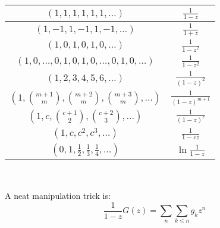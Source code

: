 \documentclass[a4paper]{amsart}
\begin{document}
\begin{multicols}{2}
      \ 

      \begin{tabular}{|c|c|}
        \hline 
        $(1,1,1,1,1,1,\ldots)$ & $\frac{1}{1-z}$ \\ \hline
        $(1,-1,1,-1,1,-1,\ldots)$ & $\frac{1}{1+z}$ \\ \hline
        $(1,0,1,0,1,0,\ldots)$ & $\frac{1}{1-z^2}$ \\ \hline        
        $(1,0,\ldots,0,1,0,1,0,\ldots,0,1,0,\ldots)$ & $\frac{1}{1-z^2}$ \\ \hline
        $(1,2,3,4,5,6,\ldots)$ & $\frac{1}{(1-z)^2}$ \\ \hline
        $(1,\binom{m+1}{m},\binom{m+2}{m},\binom{m+3}{m},\ldots)$ & $\frac{1}{(1-z)^{m+1}}$ \\ \hline
        $(1,c,\binom{c+1}{2},\binom{c+2}{3},\ldots)$ & $\frac{1}{(1-z)^c}$ \\ \hline    
        $(1,c,c^2, c^3, \ldots)$ & $\frac{1}{1-cz}$ \\ \hline    
        $(0,1,\frac{1}{2},\frac{1}{3},\frac{1}{4},\ldots)$ & $\ln \frac{1}{1-z}$ \\ \hline    
      \end{tabular}      

      \ 

      A neat manipulation trick is:
      \begin{equation*}
        \frac{1}{1-z}G(z) = \sum_{n}\sum_{k\leq n}g_kz^n
      \end{equation*}
  \end{multicols}
\end{document}

